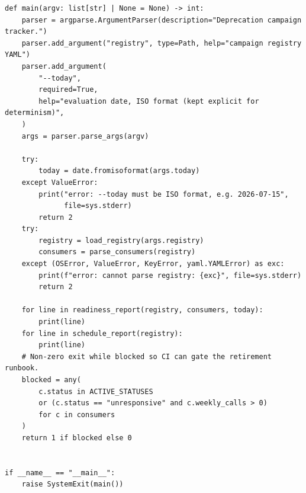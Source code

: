 \begin{verbatim}
def main(argv: list[str] | None = None) -> int:
    parser = argparse.ArgumentParser(description="Deprecation campaign tracker.")
    parser.add_argument("registry", type=Path, help="campaign registry YAML")
    parser.add_argument(
        "--today",
        required=True,
        help="evaluation date, ISO format (kept explicit for determinism)",
    )
    args = parser.parse_args(argv)

    try:
        today = date.fromisoformat(args.today)
    except ValueError:
        print("error: --today must be ISO format, e.g. 2026-07-15",
              file=sys.stderr)
        return 2
    try:
        registry = load_registry(args.registry)
        consumers = parse_consumers(registry)
    except (OSError, ValueError, KeyError, yaml.YAMLError) as exc:
        print(f"error: cannot parse registry: {exc}", file=sys.stderr)
        return 2

    for line in readiness_report(registry, consumers, today):
        print(line)
    for line in schedule_report(registry):
        print(line)
    # Non-zero exit while blocked so CI can gate the retirement runbook.
    blocked = any(
        c.status in ACTIVE_STATUSES
        or (c.status == "unresponsive" and c.weekly_calls > 0)
        for c in consumers
    )
    return 1 if blocked else 0


if __name__ == "__main__":
    raise SystemExit(main())
\end{verbatim}

